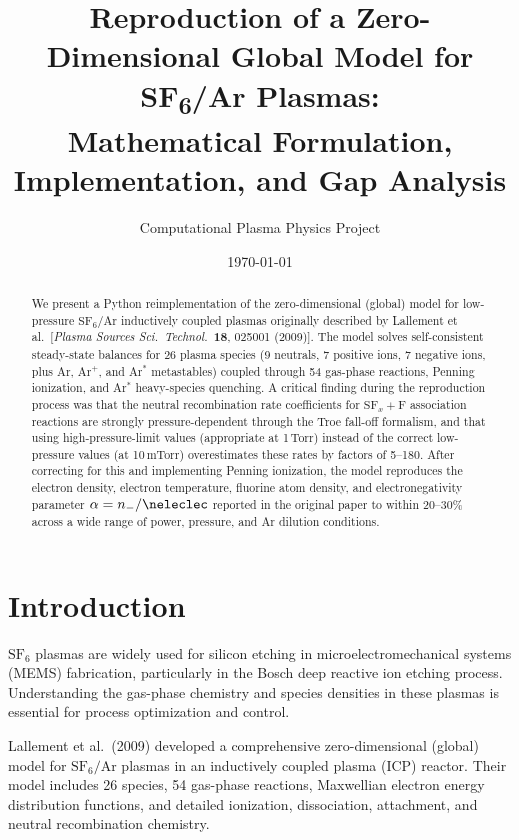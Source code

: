 \documentclass[11pt,a4paper]{article}
\title{Reproduction of a Zero-Dimensional Global Model for SF\textsubscript{6}/Ar Plasmas:\\Mathematical Formulation, Implementation, and Gap Analysis}
\author{Computational Plasma Physics Project}
\date{\today}
\newcommand{\SFx}{\mathrm{SF}_x}
\newcommand{\SFsix}{\mathrm{SF}_6}
\newcommand{\Ar}{\mathrm{Ar}}
\begin{document}
\maketitle

\begin{abstract}
We present a Python reimplementation of the zero-dimensional (global) model for low-pressure $\SFsix/\Ar$ inductively coupled plasmas originally described by Lallement et al.\ [\textit{Plasma Sources Sci.\ Technol.}\ \textbf{18}, 025001 (2009)].  The model solves self-consistent steady-state balances for 26 plasma species (9 neutrals, 7 positive ions, 7 negative ions, plus Ar, Ar$^+$, and Ar$^*$ metastables) coupled through 54 gas-phase reactions, Penning ionization, and Ar$^*$ heavy-species quenching.  A critical finding during the reproduction process was that the neutral recombination rate coefficients for $\SFx + \mathrm{F}$ association reactions are strongly pressure-dependent through the Troe fall-off formalism, and that using high-pressure-limit values (appropriate at 1\,Torr) instead of the correct low-pressure values (at 10\,mTorr) overestimates these rates by factors of 5--180.  After correcting for this and implementing Penning ionization, the model reproduces the electron density, electron temperature, fluorine atom density, and electronegativity parameter $\alpha = n_-/\neleclec$ reported in the original paper to within 20--30\% across a wide range of power, pressure, and Ar dilution conditions.
\end{abstract}

\tableofcontents
\newpage

\section{Introduction}

$\SFsix$ plasmas are widely used for silicon etching in microelectromechanical systems (MEMS) fabrication, particularly in the Bosch deep reactive ion etching process.  Understanding the gas-phase chemistry and species densities in these plasmas is essential for process optimization and control.

Lallement et al.\ (2009) developed a comprehensive zero-dimensional (global) model for $\SFsix/\Ar$ plasmas in an inductively coupled plasma (ICP) reactor.  Their model includes 26 species, 54 gas-phase reactions, Maxwellian electron energy distribution functions, and detailed ionization, dissociation, attachment, and neutral recombination chemistry.
\end{document}
